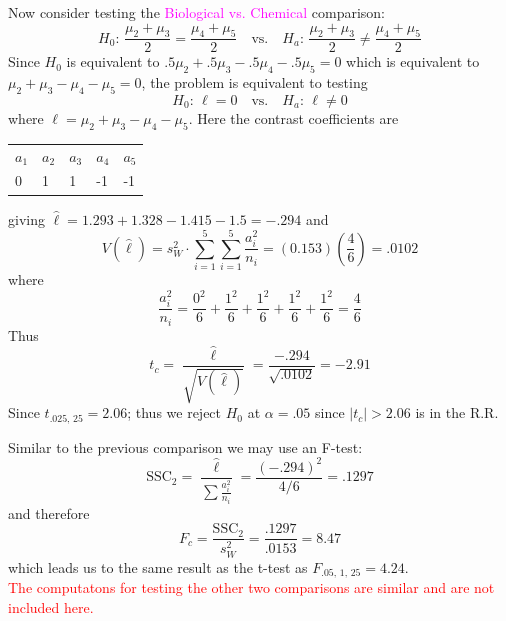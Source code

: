 \documentclass[xcolor=dvipsnames,12pt]{beamer}
\begin{document}
\begin{frame}
Now consider testing the {\textcolor{magenta}{Biological vs. Chemical}} comparison:
$$H_0:\,\frac{\mu_2+\mu_3}{2} = \frac{\mu_4+\mu_5}{2} \quad
\mbox{vs.} \quad H_a:\, \frac{\mu_2+\mu_3}{2} \neq \frac{\mu_4+\mu_5}{2} $$
Since $H_0$ is equivalent to $.5\mu_2+.5\mu_3-.5\mu_4-.5\mu_5=0$
which is equivalent to $\mu_2+\mu_3-\mu_4-\mu_5=0$, the problem is
equivalent to testing
$$H_0:\,\ell = 0 \quad \mbox{vs.} \quad H_a:\, \ell \neq 0$$
where $\ell = \mu_2+\mu_3-\mu_4-\mu_5$. Here the contrast
coefficients are
\begin{center} 
\begin{tabular*}{3in}{@{\extracolsep{\fill}}lllll}
$a_1$ & $a_2$ & $a_3$ & $a_4$ & $a_5$\\ 
0 & 1 & 1 & -1 & -1 
\end{tabular*}
\end{center}
\end{frame}


\begin{frame}
giving $\hat{\ell}=1.293+1.328 -1.415 -1.5=-.294$ and\\ 
$$ V(\hat{\ell})=s^2_W\cdot\sum^5_{i=1}
\sum^5_{i=1}\frac{a^2_i}{n_i}=(0.153)\left(\frac{4}{6}\right)=.0102$$
where \\
$$\frac{a^2_i}{n_i}=\frac{0^2}{6}+\frac{1^2}{6}+\frac{1^2}{6}+\frac{1^2}{6}+\frac{1^2}{6}=\frac{4}{6}$$
Thus \\[-.3in]
$$
t_c=\frac{\hat{\ell}}{\sqrt{V(\hat{\ell})}}=\frac{-.294}{\sqrt{.0102}}=-2.91$$
Since $t_{.025,\,25}=2.06$; thus we reject $H_0$ at
$\alpha=.05$ since $|t_c|>2.06$ is in the R.R. 
\end{frame}


\begin{frame}
Similar to the previous comparison we may use an F-test:
$$\mbox{SSC}_2=\frac{\hat{\ell}}{\sum\frac{a^2_i}{n_i}}=\frac{(-.294)^2}{4/6}=.1297$$
and therefore 
$$ F_c= \frac{\mbox{SSC}_2}{s^2_W}=\frac{.1297}{.0153}=8.47$$ which
leads us to the same result as the t-test as  $F_{.05,\,1,\,25}=4.24$.\\[.05in]
{\textcolor{red}{The computatons for testing the other two  comparisons are similar and are not included here.}}
\end{frame}

\end{document}
